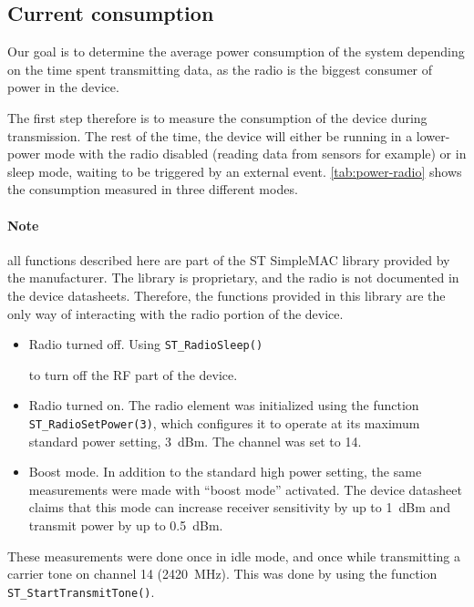 \subsection{Current consumption}\label{sub:current-consumption}

Our goal is to determine the average power consumption of the system depending
on the time spent transmitting data, as the radio is the biggest consumer of
power in the device.

The first step therefore is to measure the consumption of the device during
transmission. The rest of the time, the device will either be running in
a lower-power mode with the radio disabled (reading data from sensors for
example) or in sleep mode, waiting to be triggered by an external event.
\autoref{tab:power-radio} shows the consumption measured in three different
modes.

\paragraph{Note} 
all functions described here are part of the ST SimpleMAC library provided
by the manufacturer. The library is proprietary, and the radio is not documented
in the device datasheets. Therefore, the functions provided in this library are
the only way of interacting with the radio portion of the device.

\begin{itemize}
  \item Radio turned off. Using \texttt{ST\_RadioSleep()}

    to turn off the RF part
    of the device.
  \item Radio turned on. The radio element was initialized using the function
    \texttt{ST\_RadioSetPower(3)}, which configures it to operate at its maximum
    standard power setting, \SI{3}{dBm}. The channel was set to 14.
  \item Boost mode. In addition to the standard high power setting, the same
    measurements were made with ``boost mode'' activated. The device datasheet
    claims that this mode can increase receiver sensitivity by up to
    \SI{1}{dBm} and transmit power by up to \SI{0.5}{dBm}.
\end{itemize}

These measurements were done once in idle mode, and once while transmitting
a carrier tone on channel 14 (\SI{2420}{MHz}). This was done by using the
function \texttt{ST\_StartTransmitTone()}.

